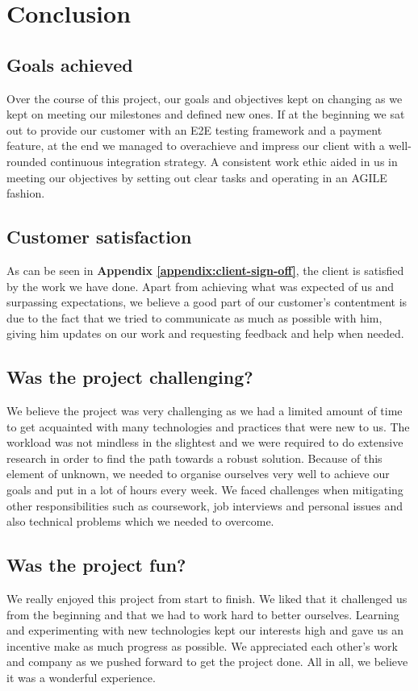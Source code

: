\chapter{Conclusion}
\label{chap:conclusion}

\section{Goals achieved}
\label{sec:goals-achieved}
Over the course of this project, our goals and objectives kept on changing as we kept on meeting our milestones and defined new ones. If at the beginning we sat out to provide our customer with an E2E testing framework and a payment feature, at the end we managed to overachieve and impress our client with a well-rounded continuous integration strategy. A consistent work ethic aided in us in meeting our objectives by setting out clear tasks and operating in an AGILE fashion.

\section{Customer satisfaction}
\label{sec:customer-sastisfaction}
As can be seen in \textbf{Appendix \ref{appendix:client-sign-off}}, the client is satisfied by the work we have done. Apart from achieving what was expected of us and surpassing expectations, we believe a good part of our customer's contentment is due to the fact that we tried to communicate as much as possible with him, giving him updates on our work and requesting feedback and help when needed.

\section{Was the project challenging?}
\label{sec:was-the-project-challenging}
We believe the project was very challenging as we had a limited amount of time to get acquainted with many technologies and practices that were new to us. The workload was not mindless in the slightest and we were required to do extensive research in order to find the path towards a robust solution. Because of this element of unknown, we needed to organise ourselves very well to achieve our goals and put in a lot of hours every week. We faced challenges when mitigating other responsibilities such as coursework, job interviews and personal issues and also technical problems which we needed to overcome.

\section{Was the project fun?}
\label{sec:was-the-project-fun}
We really enjoyed this project from start to finish. We liked that it challenged us from the beginning and that we had to work hard to better ourselves. Learning and experimenting with new technologies kept our interests high and gave us an incentive make as much progress as possible. We appreciated each other's work and company as we pushed forward to get the project done. All in all, we believe it was a wonderful experience.


